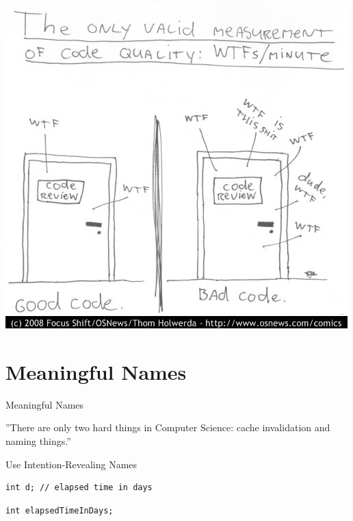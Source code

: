 \documentclass{beamer}
\begin{document}
\begin{frame}
\includegraphics[scale=0.25]{img/wtfm.png}
\end{frame}

\section{Meaningful Names}

\begin{frame}{Meaningful Names}
\begin{exampleblock}{}
  \begin{large}
  ''There are only two hard things in Computer Science: cache
  invalidation and naming things.''
  \end{large}
  \vskip5mm
  \hspace*{}
\end{exampleblock}
\end{frame}

\begin{frame}[fragile]{Use Intention-Revealing Names}
\begin{lstlisting}
int d; // elapsed time in days
\end{lstlisting}

\begin{lstlisting}
int elapsedTimeInDays;
\end{lstlisting}
\end{frame}
\end{document}
